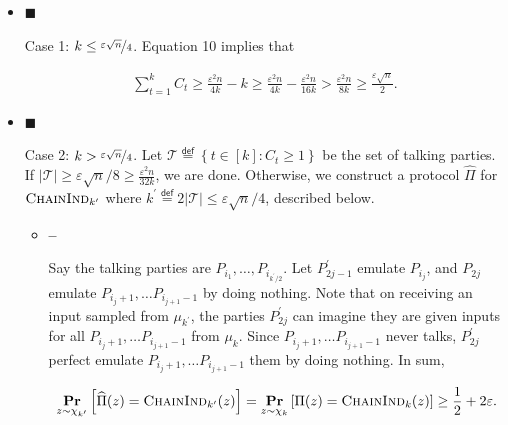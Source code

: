 \documentclass[10pt,a4paper]{article}
\begin{document}
\begin{itemize}


\item[] 
$\blacksquare$ 


Case 1: $k\leq\nicefrac{{\varepsilon\sqrt{n}}}{{4}}$.
Equation 10 implies that\par


\[\begin{gathered}
\sum_{t=1}^{k}C_{t}\geq\frac{\varepsilon^{2}n}{4k}-k\geq\frac{\varepsilon^{2}n}{4k}-\frac{\varepsilon^{2}n}{16k}>\frac{\varepsilon^{2}n}{8k}\geq\frac{\varepsilon\sqrt{n}}{2}.
\end{gathered}\]





\item[] 
$\blacksquare$ 


Case 2: $k>\nicefrac{{\varepsilon\sqrt{n}}}{{4}}$.
Let $\mathcal{T}\stackrel{{\scriptstyle\mathsf{def}}}{{=}}\left\{t\in[k]:C_{t}\geq 1\right\}$ be the set of talking parties.
If $|\mathcal{T}|\geq\varepsilon\sqrt{n}/8\geq\frac{\varepsilon^{2}n}{32k}$, we are done.
Otherwise, we construct a protocol $\widehat{\Pi}$ for $\textsc{ChainInd}_{k^{\prime}}$ where $k^{\prime}\stackrel{{\scriptstyle\mathsf{def}}}{{=}}2|\mathcal{T}|\leq\varepsilon\sqrt{n}/4$, described below.\par


\begin{itemize}


\item[] 
\textbf{–} 


Say the talking parties are $P_{i_{1}},\dots,P_{i_{k^{\prime}/2}}$.
Let $P_{2j-1}^{\prime}$ emulate $P_{i_{j}}$,
and $P_{2j}$ emulate $P_{i_{j}+1},\dots P_{i_{j+1}-1}$ by doing nothing.
Note that on receiving an input sampled from $\mu_{k^{\prime}}$, the parties $P_{2j}^{\prime}$ can imagine they are given inputs for all $P_{i_{j}+1},\dots P_{i_{j+1}-1}$ from $\mu_{k}$.
Since $P_{i_{j}+1},\dots P_{i_{j+1}-1}$ never talks, $P_{2j}^{\prime}$ perfect emulate $P_{i_{j}+1},\dots P_{i_{j+1}-1}$ them by doing nothing.
In sum,\par


\[\begin{gathered}
\operatorname*{\mathbf{Pr}}_{z\sim\chi_{k^{\prime}}}\left[\widehat{\Pi}(z)=\textsc{ChainInd}_{k^{\prime}}(z)\right]=\operatorname*{\mathbf{Pr}}_{z\sim\chi_{k}}\left[\Pi(z)=\textsc{ChainInd}_{k}(z)\right]\geq\frac{1}{2}+2\varepsilon.
\end{gathered}\]



\end{itemize}
\end{itemize}
\end{document}
